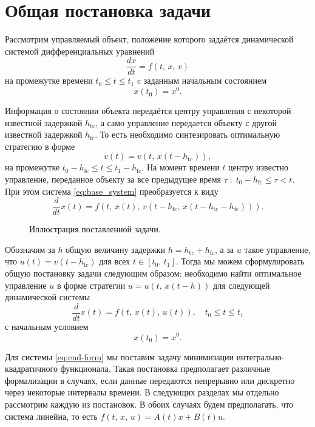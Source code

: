 \section{Общая постановка задачи}

Рассмотрим управляемый объект, положение которого задаётся динамической системой дифференциальных уравнений
\begin{equation}\label{eq:base_system}
        \frac{dx}{dt}
        =
        f(t,\,x,\,v)
\end{equation}
на промежутке времени $t_0 \leqslant t \leqslant t_1$ c заданным начальным состоянием
$$
        x(t_0) = x^0.
$$

Информация о состоянии объекта передаётся центру управления с некоторой известной задержкой $h_{\mathrm{tc}}$, а само управление передается объекту с другой известной задержкой $h_{\mathrm{fc}}$. То есть необходимо синтезировать оптимальную стратегию в форме
$$
        v(t) = v(t,\, x(t - h_{\mathrm{tc}})),
$$
на промежутке $t_0 - h_{\mathrm{fc}} \leqslant t \leqslant t_1 - h_{\mathrm{fc}}$. На момент времени $t$ центру известно управление, переданное объекту за все предыдущее время $\tau\;:\;t_0 - h_{\mathrm{fc}}\leqslant\tau < t$. При этом система \eqref{eq:base_system} преобразуется к виду
$$
        \frac{d}{dt}x(t)
        =
        f(t,\,x(t),\,v(t - h_{\mathrm{fc}},\, x(t - h_{\mathrm{tc}} - h_{\mathrm{fc}}))).
$$

        
\begin{figure}[h]
        \centering
        \vspace{1cm}
        
        \caption{Иллюстрация поставленной задачи.}
        \label{img:formulation}
        \vspace{1cm}
\end{figure}

Обозначим за $h$ общую величину задержки $h = h_{\mathrm{tc}} + h_{\mathrm{fc}}$, а за $u$ такое управление, что $u(t) = v(t-h_{\mathrm{fc}})$ для всех $t \in [t_0,\,t_1]$.
Тогда мы можем сформулировать общую постановку задачи следующим образом: необходимо найти оптимальное управление $u$ в форме стратегии $u = u(t,\, x(t-h))$ для следующей динамической системы
\begin{equation}\label{eq:end-form}
        \frac{d}{dt}x(t) = f(t,\,x(t),\,u(t)), \quad t_0\leqslant t\leqslant t_1
\end{equation}
с начальным условием
$$
        x(t_0) = x^0.
$$

Для системы \eqref{eq:end-form} мы поставим задачу минимизации интегрально-квадра\-тич\-ного функционала. Такая постановка предполагает различные формализации в случаях, если данные передаются непрерывно или дискретно через некоторые интервалы времени. В следующих разделах мы отдельно рассмотрим каждую из постановок. В обоих случаях будем предполагать, что система линейна, то есть $f(t,\,x,\,u) = A(t)x + B(t)u.$


